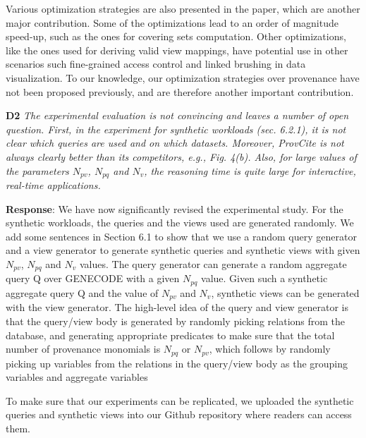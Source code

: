 \begin{appendix}
Various optimization strategies are also presented in the paper, which are another major contribution. Some of the optimizations lead to an order of magnitude speed-up, such as the ones for covering sets computation.  Other optimizations, like the ones used for deriving valid view mappings, have potential use in other scenarios such fine-grained access control and linked brushing in data visualization. To our knowledge, our optimization strategies over provenance have not been proposed previously, and are therefore another important contribution.

\textbf{D2} \textit{The experimental evaluation is not convincing and leaves a number of open question. 
First, in the experiment for synthetic workloads (sec. 6.2.1), it is not clear which queries are used and on which datasets. Moreover, ProvCite is not always clearly better than its competitors, e.g., Fig. 4(b). Also, for large values of the parameters $N_{pv}$, $N_{pq}$ and $N_v$, the reasoning time is quite large for interactive, real-time applications.}


\textbf{Response}: We have now significantly revised the experimental study. For the synthetic workloads, the queries and the views used are generated randomly. We add some sentences in Section 6.1 to show that we use a random query generator and a view generator to generate synthetic queries and synthetic views with given $N_{pv}$, $N_{pq}$ and $N_v$ values.  The query generator can generate a random aggregate query Q over GENECODE with a given $N_{pq}$ value. Given such a synthetic aggregate query Q and the value of $N_{pv}$ and $N_v$, synthetic views can be generated with the view generator. The high-level idea of the query and view generator is that the query/view body is generated by randomly picking relations from the database, and generating appropriate predicates to make sure that the total number of provenance monomials is $N_{pq}$ or $N_{pv}$, which follows by randomly picking up variables from the relations in the query/view body as the grouping variables and aggregate variables

To make sure that our experiments can be replicated, we uploaded the synthetic queries and synthetic views into our Github repository where readers can access them.


\end{appendix}
